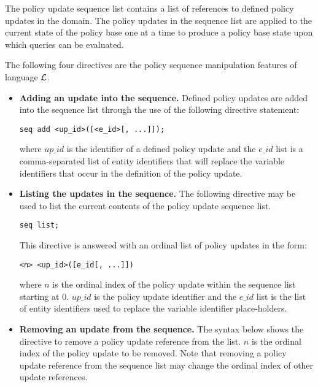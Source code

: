 \documentclass[11pt]{llncs}
\begin{document}
        The policy update sequence list contains a list of references to
        defined policy updates in the domain. The policy updates in the
        sequence list are applied to the current state of the policy base one
        at a time to produce a policy base state upon which queries can be
        evaluated.

        The following four directives are the policy sequence manipulation
        features of language $\cal{L}$.

        \begin{itemize}
          \item
            {\bf Adding an update into the sequence.} Defined policy updates
            are added into the sequence list through the use of the following
            directive statement:

            \begin{verbatim}seq add <up_id>([<e_id>[, ...]]);\end{verbatim}

            \noindent where $up\_id$ is the identifier of a defined policy
            update and the $e\_id$ list is a comma-separated list of entity
            identifiers that will replace the variable identifiers that occur
            in the definition of the policy update.

          \vspace{1mm}
          \item
            {\bf Listing the updates in the sequence.} The following
            directive may be used to list the current contents of the policy
            update sequence list.

            \begin{verbatim}seq list;\end{verbatim}

            This directive is answered with an ordinal list of policy
            updates in the form:

            \begin{verbatim}<n> <up_id>([e_id[, ...]])\end{verbatim}

            \noindent where $n$ is the ordinal index of the policy update
            within the sequence list starting at 0. $up\_id$ is the policy
            update identifier and the $e\_id$ list is the list of entity
            identifiers used to replace the variable identifier
            place-holders.

          \vspace{1mm}
          \item
            {\bf Removing an update from the sequence.} The syntax below
            shows the directive to remove a policy update reference from the
            list. $n$ is the ordinal index of the policy update to be
            removed. Note that removing a policy update reference from the
            sequence list may change the ordinal index of other update
            references.


\end{itemize}
\end{document}
